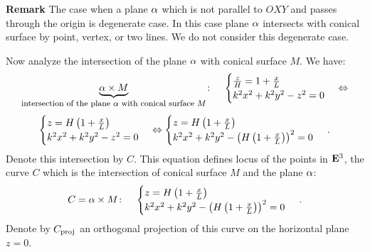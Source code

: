 \documentclass[12pt]{article}
\numberwithin{equation}{section}
\begin{document}
{\bf Remark} {\footnotesize   The case when a plane $\alpha$
which is not parallel to $OXY$ and passes through the origin is degenerate case.
  In this case plane $\alpha$ intersects with conical surface by
point, vertex, or two lines.  We do not consider this degenerate case.}



  Now analyze the intersection of the plane $\alpha$ with conical
surface $M$.   We have:
          \begin{equation*}
\underbrace{\alpha\times M}_{\hbox 
{{\footnotesize intersection of the plane $\alpha$
 with conical surface $M$}}}
\colon\quad
      \begin{cases}
  {z\over H}=1+{x\over L}\cr
      k^2x^2+k^2y^2-z^2=0\cr    
      \end{cases}
     \Leftrightarrow
          \end{equation*}
     \begin{equation*} 
      \begin{cases}
      z=H\left(1+{x\over L}\right)\cr
      k^2x^2+k^2y^2-z^2=0\cr    
      \end{cases}
      \Leftrightarrow
      \begin{cases}
      z=H\left(1+{x\over L}\right)\cr
      k^2x^2+k^2y^2-
   \left(H\left(1+{x\over L}\right)\right)^2=0\cr    
      \end{cases}\,.
     \end{equation*} 
Denote this intersection by $C$. This equation defines
locus of the points in ${\bf E}^3$, the curve
$C$ which is the intersection of conical surface $M$
and the plane $\alpha$:
           \begin{equation}\label{conicsectionequation1}
C=\alpha\times M\colon \quad \begin{cases}
      z=H\left(1+{x\over L}\right)\cr
      k^2x^2+k^2y^2-
   \left(H\left(1+{x\over L}\right)\right)^2=0\cr    
      \end{cases}\,.
           \end{equation}
Denote by $C_{\rm proj}$ an orthogonal projection of this curve
on the horizontal plane $z=0$.
\end{document}
